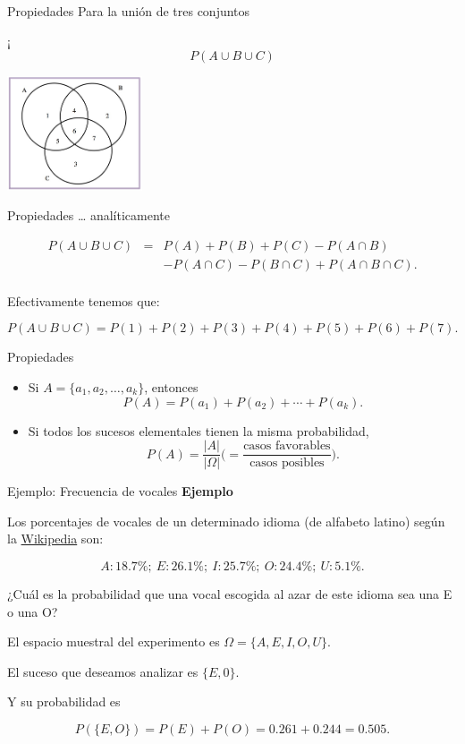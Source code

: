 \documentclass[
  ignorenonframetext,
  aspectratio=169]{beamer}
\begin{document}
\begin{frame}{Propiedades}
\label{propiedades-5}
Para la unión de tres conjuntos

¡ \[P(A\cup B\cup C)\]

\begin{center}
\includegraphics[width=0.3\textwidth,height=\textheight]{Images/proba1dibujos/tresconjunts.jpg}
\end{center}
\end{frame}

\begin{frame}{Propiedades}
\label{propiedades-6}
\ldots{} analíticamente

\begin{eqnarray*}
P(A\cup B\cup C)&=&P(A)+P(B)+P(C)-P(A\cap B) \\
  & & - P(A\cap C)-P(B\cap C)+P(A\cap B\cap C).\\
  \end{eqnarray*}

Efectivamente tenemos que:

\[P(A\cup B\cup C)=P(1)+P(2)+P(3)+P(4)+P(5)+P(6)+P(7).\]
\end{frame}

\begin{frame}{Propiedades}
\label{propiedades-7}
\begin{itemize}
\item
  Si \(A=\{a_1,a_2,\ldots,a_k\}\), entonces \[
  P(A)=P(a_1)+P(a_2)+\cdots+P(a_k).
  \]
\item
  Si todos los sucesos elementales tienen la misma probabilidad, \[
  P(A)=\frac{|A|}{|\Omega|}\Big(=\frac{\mbox{casos favorables}}{\mbox{casos posibles}}\Big).
  \]
\end{itemize}
\end{frame}

\begin{frame}{Ejemplo: Frecuencia de vocales}
\label{ejemplo-frecuencia-de-vocales}
\textbf{Ejemplo}

Los porcentajes de vocales de un determinado idioma (de alfabeto latino)
según la
\href{https://es.wikipedia.org/wiki/Frecuencia_de_aparici\%C3\%B3n_de_letras}{Wikipedia}
son:

\[A: 18.7\%;\ E: 26.1\%;\ I: 25.7\%;\ O: 24.4\%;\ U: 5.1\%.\]

¿Cuál es la probabilidad que una vocal escogida al azar de este idioma
sea una E o una O?

El espacio muestral del experimento es \(\Omega=\{A,E,I,O,U\}\).

El suceso que deseamos analizar es \(\{E,0\}\).

Y su probabilidad es

\[P(\{E,O\})=P(E)+P(O)=0.261+0.244=0.505.\]
\end{frame}
\end{document}
